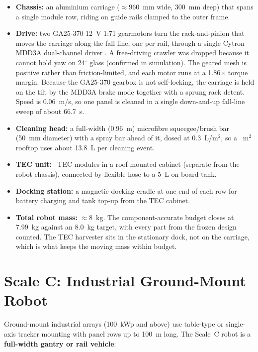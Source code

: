 \documentclass[12pt,a4paper]{report}   %
\begin{document}
\begin{itemize}[leftmargin=*]
  \item \textbf{Chassis:} an aluminium carriage ($\approx 960$~mm wide, 300~mm deep) that
  spans a single module row, riding on guide rails clamped to the outer frame.
  \item \textbf{Drive:} two GA25-370 12~V 1:71 gearmotors turn the rack-and-pinion that
  moves the carriage along the fall line, one per rail, through a single Cytron MDD3A
  dual-channel driver \cite{cytronmdd3a}. A free-driving crawler was dropped because it
  cannot hold yaw on 24$^\circ$ glass (confirmed in simulation). The geared mesh is
  positive rather than friction-limited, and each motor runs at a 1.86$\times$ torque
  margin. Because the GA25-370 gearbox is not self-locking, the carriage is held on the
  tilt by the MDD3A brake mode together with a sprung rack detent. Speed is 0.06~m/s, so
  one panel is cleaned in a single down-and-up fall-line sweep of about 66.7~s.
  \item \textbf{Cleaning head:} a full-width (0.96~m) microfibre squeegee/brush bar
  (50~mm diameter) with a spray bar ahead of it, dosed at 0.3~L/m$^2$, so a
  \ScaleBCleanArea~m$^2$ rooftop uses about 13.8~L per cleaning event.
  \item \textbf{TEC unit:} \ScaleBTECn~TEC modules in a roof-mounted cabinet (separate from the
  robot chassis), connected by flexible hose to a 5~L on-board tank.
  \item \textbf{Docking station:} a magnetic docking cradle at one end of each row for battery
  charging and tank top-up from the TEC cabinet.
  \item \textbf{Total robot mass:} ${\approx}$8~kg. The component-accurate budget closes
  at 7.99~kg against an 8.0~kg target, with every part from the frozen design counted.
  The TEC harvester sits in the stationary dock, not on the carriage, which is what keeps
  the moving mass within budget.
\end{itemize}

\section{Scale C: Industrial Ground-Mount Robot}

Ground-mount industrial arrays (100~kWp and above) use table-type or single-axis tracker mounting
with panel rows up to 100~m long. The Scale~C robot is a \textbf{full-width gantry or rail
vehicle}:
\end{document}
